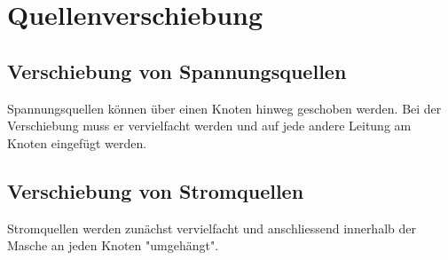 



\section{Quellenverschiebung}

\subsection{Verschiebung von Spannungsquellen}
Spannungsquellen können über einen Knoten hinweg geschoben werden. Bei der Verschiebung muss er vervielfacht werden und auf jede andere Leitung am Knoten eingefügt werden. 

\subsection{Verschiebung von Stromquellen}
Stromquellen werden zunächst vervielfacht und anschliessend innerhalb der Masche an jeden Knoten "umgehängt". 
